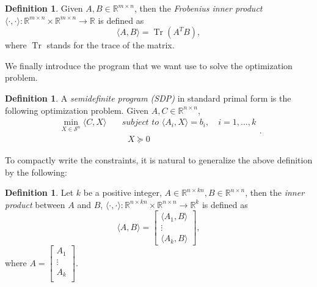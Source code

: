\documentclass[12pt]{amsart}
\numberwithin{equation}{section}
\theoremstyle{definition}
\newtheorem{definition}[thm]{Definition}
\numberwithin{thm}{section}
\DeclareMathOperator{\Tr}{Tr}
\begin{document}
\begin{definition}
     \label{def: mtx_inner_product}
     Given $A, B \in \mathbb{R}^{m \times n}$, then the \emph{Frobenius inner product}\\ $\langle \cdot, \cdot \rangle: \mathbb{R}^{m \times n} \times \mathbb{R}^{m \times n} \to \mathbb{R}$ is defined as
     \begin{equation*}
          \langle A, B \rangle = \Tr(A^TB),
     \end{equation*}
     where $\Tr$ stands for the trace of the matrix.
\end{definition}

We finally introduce the program that we want use to solve the optimization problem.
\begin{definition}
     \label{def:SDP}
     A \emph{semidefinite program (SDP)} in standard primal form is the following optimization problem.
     Given $A, C \in \mathbb{R}^{n \times n}$, 
     \begin{equation}\label{eq:SDP}
          \begin{split}
               \min_{X \in \mathcal{S}^n} \langle C, X \rangle & \quad \textit{subject to } \langle A_i, X \rangle = b_i, \quad i=1,...,k\\
               & \quad \textit{\ \ \ \ \ \ \ \ \ \ \ \ \ \ } X \succcurlyeq 0 
          \end{split}.
     \end{equation}
\end{definition}

To compactly write the constraints, it is natural to generalize the above definition by the following:
\begin{definition}
     \label{def: mtx_inner_product_concat}
     Let $k$ be a positive integer, $A \in \mathbb{R}^{n \times kn}, B \in \mathbb{R}^{n \times n}$, then the \emph{inner product} between $A$ and $B$, $\langle \cdot, \cdot \rangle: \mathbb{R}^{n \times kn} \times \mathbb{R}^{n \times n} \to \mathbb{R}^k$ is defined as
     \begin{equation*}
          \langle A, B \rangle = \begin{bmatrix}
               \langle A_1, B \rangle \\
               \vdots\\
               \langle A_k, B \rangle
          \end{bmatrix},
     \end{equation*}
     where $A = \begin{bmatrix}
          A_1\\
          \vdots\\
          A_k\\
     \end{bmatrix}$.
\end{definition}
\end{document}
